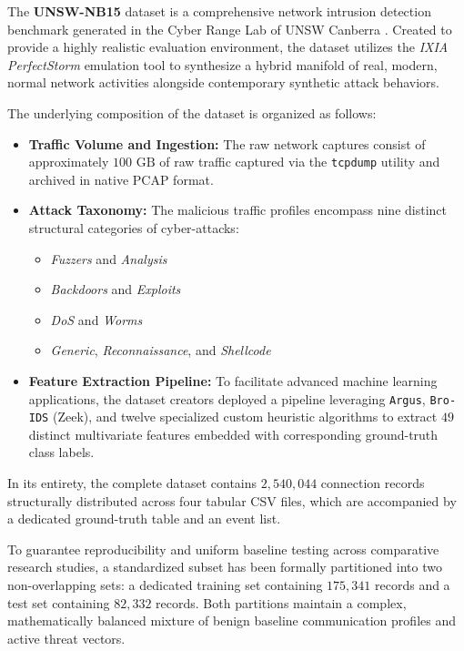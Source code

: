 \documentclass[12pt, a4paper]{report}
\begin{document}
The \textbf{UNSW-NB15} dataset is a comprehensive network intrusion detection benchmark generated in the Cyber Range Lab of UNSW Canberra \cite{UNSW-NB15dataset}. Created to provide a highly realistic evaluation environment, the dataset utilizes the \textit{IXIA PerfectStorm} emulation tool to synthesize a hybrid manifold of real, modern, normal network activities alongside contemporary synthetic attack behaviors.

The underlying composition of the dataset is organized as follows:

\begin{itemize}
    \item \textbf{Traffic Volume and Ingestion:} The raw network captures consist of approximately $100\text{~GB}$ of raw traffic captured via the \texttt{tcpdump} utility and archived in native PCAP format. 
    \item \textbf{Attack Taxonomy:} The malicious traffic profiles encompass nine distinct structural categories of cyber-attacks:
    \begin{itemize}
        \item \textit{Fuzzers} and \textit{Analysis}
        \item \textit{Backdoors} and \textit{Exploits}
        \item \textit{DoS} and \textit{Worms}
        \item \textit{Generic}, \textit{Reconnaissance}, and \textit{Shellcode}
    \end{itemize}
    \item \textbf{Feature Extraction Pipeline:} To facilitate advanced machine learning applications, the dataset creators deployed a pipeline leveraging \texttt{Argus}, \texttt{Bro-IDS} (Zeek), and twelve specialized custom heuristic algorithms to extract $49$ distinct multivariate features embedded with corresponding ground-truth class labels.
\end{itemize}

In its entirety, the complete dataset contains $2,540,044$ connection records structurally distributed across four tabular CSV files, which are accompanied by a dedicated ground-truth table and an event list. 

To guarantee reproducibility and uniform baseline testing across comparative research studies, a standardized subset has been formally partitioned into two non-overlapping sets: a dedicated training set containing $175,341$ records and a test set containing $82,332$ records. Both partitions maintain a complex, mathematically balanced mixture of benign baseline communication profiles and active threat vectors.
\end{document}
